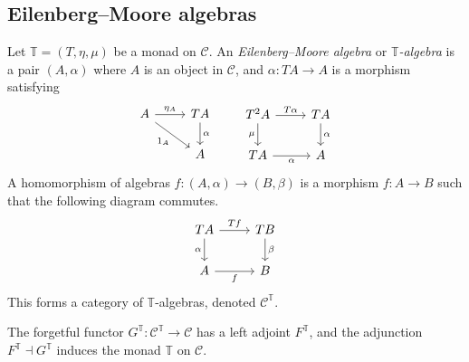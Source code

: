 \subsection{Eilenberg--Moore algebras}
\begin{definition}
    Let \( \mathbb T = (T, \eta, \mu) \) be a monad on \( \mathcal C \).
    An \emph{Eilenberg--Moore algebra} or \emph{\( \mathbb T \)-algebra} is a pair \( (A, \alpha) \) where \( A \) is an object in \( \mathcal C \), and \( \alpha : TA \to A \) is a morphism satisfying
\[\begin{tikzcd}
	A & TA \\
	& A
	\arrow["{\eta_A}", from=1-1, to=1-2]
	\arrow["\alpha", from=1-2, to=2-2]
	\arrow["{1_A}"', from=1-1, to=2-2]
\end{tikzcd}\quad\quad\begin{tikzcd}
	T^2A & TA \\
	TA & A
	\arrow["T\alpha", from=1-1, to=1-2]
	\arrow["\alpha", from=1-2, to=2-2]
	\arrow["\mu"', from=1-1, to=2-1]
	\arrow["\alpha"', from=2-1, to=2-2]
\end{tikzcd}\]
    A homomorphism of algebras \( f : (A, \alpha) \to (B, \beta) \) is a morphism \( f : A \to B \) such that the following diagram commutes.
\[\begin{tikzcd}
	TA & TB \\
	A & B
	\arrow["Tf", from=1-1, to=1-2]
	\arrow["\beta", from=1-2, to=2-2]
	\arrow["\alpha"', from=1-1, to=2-1]
	\arrow["f"', from=2-1, to=2-2]
\end{tikzcd}\]
    This forms a category of \( \mathbb T \)-algebras, denoted \( \mathcal C^{\mathbb T} \).
\end{definition}
\begin{proposition}
    The forgetful functor \( G^{\mathbb T} : \mathcal C^{\mathbb T} \to \mathcal C \) has a left adjoint \( F^{\mathbb T} \), and the adjunction \( F^{\mathbb T} \dashv G^{\mathbb T} \) induces the monad \( \mathbb T \) on \( \mathcal C \).
\end{proposition}
